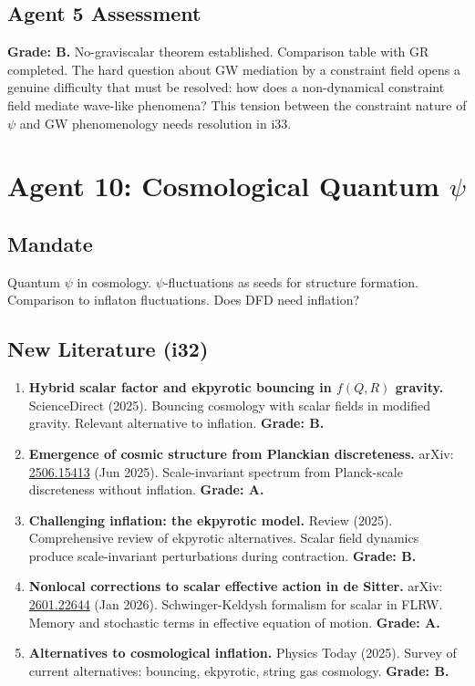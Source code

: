 \documentclass[11pt,a4paper]{article}
\begin{document}
\subsection{Agent 5 Assessment}

\textbf{Grade: B.} No-graviscalar theorem established. Comparison table with GR completed. The hard question about GW mediation by a constraint field opens a genuine difficulty that must be resolved: how does a non-dynamical constraint field mediate wave-like phenomena? This tension between the constraint nature of $\psi$ and GW phenomenology needs resolution in i33.


\newpage
\section{Agent 10: Cosmological Quantum $\psi$}
\label{sec:agent10}

\subsection{Mandate}

Quantum $\psi$ in cosmology. $\psi$-fluctuations as seeds for structure formation. Comparison to inflaton fluctuations. Does DFD need inflation?

\subsection{New Literature (i32)}

\begin{enumerate}
\item \textbf{Hybrid scalar factor and ekpyrotic bouncing in $f(Q,R)$ gravity.} ScienceDirect (2025). Bouncing cosmology with scalar fields in modified gravity. Relevant alternative to inflation. \textbf{Grade: B.}

\item \textbf{Emergence of cosmic structure from Planckian discreteness.} arXiv: \href{https://arxiv.org/abs/2506.15413}{2506.15413} (Jun 2025). Scale-invariant spectrum from Planck-scale discreteness without inflation. \textbf{Grade: A.}

\item \textbf{Challenging inflation: the ekpyrotic model.} Review (2025). Comprehensive review of ekpyrotic alternatives. Scalar field dynamics produce scale-invariant perturbations during contraction. \textbf{Grade: B.}

\item \textbf{Nonlocal corrections to scalar effective action in de Sitter.} arXiv: \href{https://arxiv.org/abs/2601.22644}{2601.22644} (Jan 2026). Schwinger-Keldysh formalism for scalar in FLRW. Memory and stochastic terms in effective equation of motion. \textbf{Grade: A.}

\item \textbf{Alternatives to cosmological inflation.} Physics Today (2025). Survey of current alternatives: bouncing, ekpyrotic, string gas cosmology. \textbf{Grade: B.}
\end{enumerate}
\end{document}
